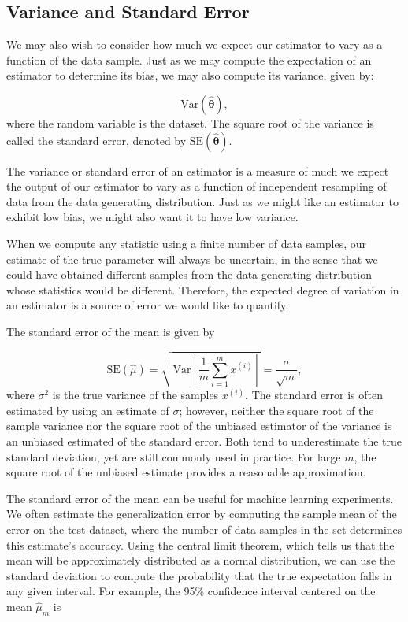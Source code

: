 \subsection{Variance and Standard Error}

We may also wish to consider how much we expect our estimator to vary as a function of the data sample. Just as we may compute the expectation of an estimator to determine its bias, we may also compute its variance, given by:

\begin{equation}
\text{Var}(\boldsymbol{\hat\theta}),
\end{equation}
where the random variable is the dataset. The square root of the variance is called the standard error, denoted by $\text{SE}(\boldsymbol{\hat\theta})$.

The variance or standard error of an estimator is a measure of much we expect the output of our estimator to vary as a function of independent resampling of data from the data generating distribution. Just as we might like an estimator to exhibit low bias, we might also want it to have low variance.

When we compute any statistic using a finite number of data samples, our estimate of the true parameter will always be uncertain, in the sense that we could have obtained different samples from the data generating distribution whose statistics would be different. Therefore, the expected degree of variation in an estimator is a source of error we would like to quantify.

The standard error of the mean is given by

\begin{equation}
\text{SE}(\hat\mu) = \sqrt{\text{Var}\left[\frac{1}{m}\sum_{i=1}^{m} x^{(i)}\right]} = \frac{\sigma}{\sqrt{m}},
\end{equation}
where $\sigma^2$ is the true variance of the samples $x^{(i)}$. The standard error is often estimated by using an estimate of $\sigma$; however, neither the square root of the sample variance nor the square root of the unbiased estimator of the variance is an unbiased estimated of the standard error. Both tend to underestimate the true standard deviation, yet are still commonly used in practice. For large $m$, the square root of the unbiased estimate provides a reasonable approximation.

The standard error of the mean can be useful for machine learning experiments. We often estimate the generalization error by computing the sample mean of the error on the test dataset, where the number of data samples in the set determines this estimate's accuracy. Using the central limit theorem, which tells us that the mean will be approximately distributed as a normal distribution, we can use the standard deviation to compute the probability that the true expectation falls in any given interval. For example, the 95\% confidence interval centered on the mean $\hat\mu_m$ is

